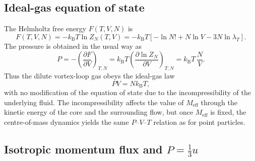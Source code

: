 \documentclass[11pt]{article}
\begin{document}
        \subsection{Ideal-gas equation of state}

            The Helmholtz free energy $F(T,V,N)$ is
            \begin{equation}
                F(T,V,N)
                = -k_{\mathrm B}T \ln Z_N(T,V)
                = -k_{\mathrm B}T
                \left[
                    -\ln N! + N\ln V - 3N\ln\lambda_T
                \right].
            \end{equation}
            The pressure is obtained in the usual way as
            \begin{equation}
                P
                = -\left(\frac{\partial F}{\partial V}\right)_{T,N}
                = k_{\mathrm B}T
                \left(\frac{\partial \ln Z_N}{\partial V}\right)_{T,N}
                = k_{\mathrm B}T\,\frac{N}{V}.
                \label{eq:ideal-gas}
            \end{equation}
            Thus the dilute vortex-loop gas obeys the ideal-gas law
            \begin{equation}
                P V = N k_{\mathrm B} T,
            \end{equation}
            with no modification of the equation of state due to the incompressibility of the underlying
            fluid. The incompressibility affects the value of $M_{\mathrm{eff}}$ through the
            kinetic energy of the core and the surrounding flow, but once $M_{\mathrm{eff}}$ is fixed,
            the centre-of-mass dynamics yields the same $P$--$V$--$T$ relation as for point particles.

        \subsection{Isotropic momentum flux and $P = \tfrac{1}{3}u$}
\end{document}
